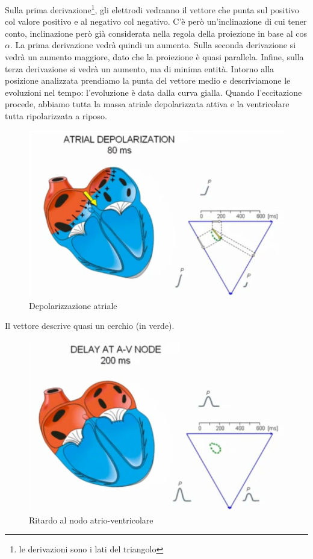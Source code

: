 \documentclass[a4paper,12pt]{article}
\begin{document}
Sulla prima derivazione\footnote{le derivazioni sono i lati del triangolo}, gli elettrodi vedranno il vettore che punta sul positivo col valore positivo e al negativo col negativo. C'è però un'inclinazione di cui tener conto, inclinazione però già considerata nella regola della proiezione in base al cos$\alpha$. La prima derivazione vedrà quindi un aumento. Sulla seconda derivazione si vedrà un aumento maggiore, dato che la proiezione è quasi parallela. Infine, sulla terza derivazione si vedrà un aumento, ma di minima entità. Intorno alla posizione analizzata prendiamo la punta del vettore medio e descriviamone le evoluzioni nel tempo: l'evoluzione è data dalla curva gialla. Quando l'eccitazione procede, abbiamo tutta la massa atriale depolarizzata attiva e la ventricolare tutta ripolarizzata a riposo.
\begin{figure}[H] 
\centering
\includegraphics[scale=0.4]{immagine/dodici.jpg}
\caption{Depolarizzazione atriale}
\end{figure}
Il vettore descrive quasi un cerchio (in verde).
\begin{figure}[H]
\centering
\includegraphics[scale=0.4]{immagine/tredici.jpg}
\caption{Ritardo al nodo atrio-ventricolare}
\end{figure}
\end{document}
